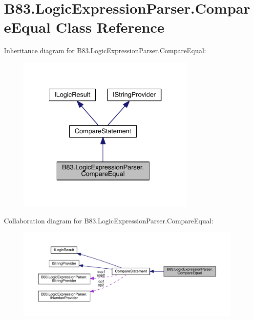 \hypertarget{class_b83_1_1_logic_expression_parser_1_1_compare_equal}{}\section{B83.\+Logic\+Expression\+Parser.\+Compare\+Equal Class Reference}
\label{class_b83_1_1_logic_expression_parser_1_1_compare_equal}


Inheritance diagram for B83.\+Logic\+Expression\+Parser.\+Compare\+Equal\+:\nopagebreak
\begin{figure}[H]
\begin{center}
\leavevmode
\includegraphics[width=251pt]{class_b83_1_1_logic_expression_parser_1_1_compare_equal__inherit__graph}
\end{center}
\end{figure}


Collaboration diagram for B83.\+Logic\+Expression\+Parser.\+Compare\+Equal\+:\nopagebreak
\begin{figure}[H]
\begin{center}
\leavevmode
\includegraphics[width=350pt]{class_b83_1_1_logic_expression_parser_1_1_compare_equal__coll__graph}
\end{center}
\end{figure}
